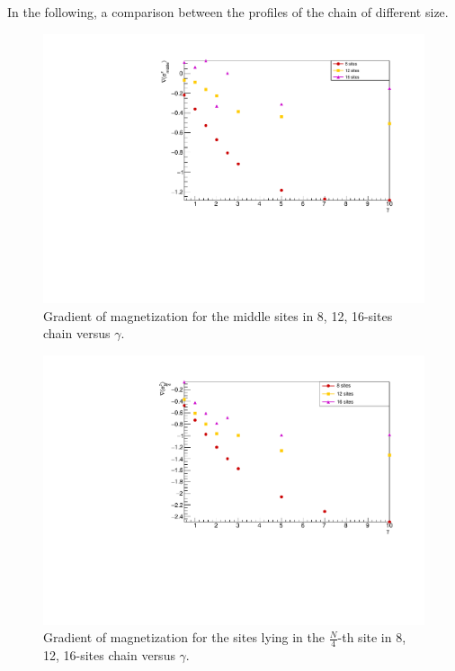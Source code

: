 In the following, a comparison between the profiles of the chain of different size.

\begin{figure}[H]
    \centering
    \includegraphics[scale=0.7]{Figures/gradLMvsGammavsSize.pdf}
    \caption{Gradient of magnetization for the middle sites in 8, 12, 16-sites chain versus $\gamma$.}
    \label{fig:gradLMvsGammavsSize}
\end{figure}

\begin{figure}[H]
    \centering
    \includegraphics[scale=0.7]{Figures/gradLMvsGammavsSize_firstQuarterChain.pdf}
    \caption{Gradient of magnetization for the sites lying in the $\frac{N}{4}$-th site in 8, 12, 16-sites chain versus $\gamma$.}
    \label{fig:gradLMvsGammavsSize_firstQuarterChain}
\end{figure}

